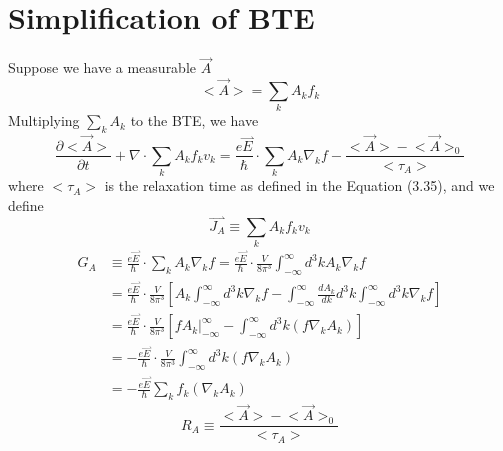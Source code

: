 \section{Simplification of BTE}
Suppose we have a measurable $\vec{A}$ \begin{equation}
    \big<\vec{A}\big> = \sum_{k}{A_{k}f_{k}}
\end{equation} Multiplying $\sum_{k}{A_{k}}$ to the BTE, we have \begin{equation}
    \frac{\partial \big<\vec{A}\big>}{\partial t} + \nabla\cdot\sum_{k}{A_{k}f_{k}v_{k}} = \frac{e\overset{\rightharpoonup}{E}}{\hbar}\cdot\sum_{k}{A_{k}\nabla_{k}f} - \frac{\big<\vec{A}\big>-\big<\vec{A}\big>_{0}}{\big<\tau_{A}\big>}
\end{equation} where $\big<\tau_{A}\big>$ is the relaxation time as defined in the Equation (3.35), and we define \begin{equation}
    \overset{\rightharpoonup}{J_{A}} \equiv \sum_{k}{A_{k}f_{k}v_{k}}
\end{equation} \begin{align}
    G_{A}& \equiv \frac{e\overset{\rightharpoonup}{E}}{\hbar}\cdot\sum_{k}{A_{k}\nabla_{k}f}= \frac{e\overset{\rightharpoonup}{E}}{\hbar}\cdot\frac{V}{8\pi^{3}}\int_{-\infty}^{\infty}d^{3}kA_{k}\nabla_{k}f\nonumber\\
    & = \frac{e\overset{\rightharpoonup}{E}}{\hbar}\cdot\frac{V}{8\pi^{3}}\left[A_{k}\int_{-\infty}^{\infty}d^{3}k\nabla_{k}f-\int_{-\infty}^{\infty}\frac{dA_{k}}{dk}d^{3}k\int_{-\infty}^{\infty}d^{3}k\nabla_{k}f\right]\nonumber\\
    & = \frac{e\overset{\rightharpoonup}{E}}{\hbar}\cdot\frac{V}{8\pi^{3}}\left[fA_{k}\big|_{-\infty}^{\infty}-\int_{-\infty}^{\infty}d^{3}k(f\nabla_{k}A_{k})\right]\nonumber\\
    & = -\frac{e\overset{\rightharpoonup}{E}}{\hbar}\cdot\frac{V}{8\pi^{3}}\int_{-\infty}^{\infty}d^{3}k(f\nabla_{k}A_{k})\nonumber\\
    & = -\frac{e\overset{\rightharpoonup}{E}}{\hbar}\sum_{k}f_{k}(\nabla_{k}A_{k})
\end{align} \begin{equation}
    R_{A} \equiv \frac{\big<\vec{A}\big>-\big<\vec{A}\big>_{0}}{\big<\tau_{A}\big>}
\end{equation}
